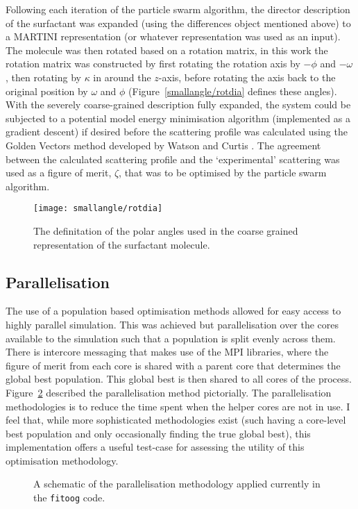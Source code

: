 Following each iteration of the particle swarm algorithm, the director description of the surfactant was expanded (using the differences object mentioned above) to a MARTINI representation (or whatever representation was used as an input).
The molecule was then rotated based on a rotation matrix, in this work the rotation matrix was constructed by first rotating the rotation axis by $-\phi$ and $-\omega$, then rotating by $\kappa$ in around the $z$-axis, before rotating the axis back to the original position by $\omega$ and $\phi$ \cite{evans_rotations_2001} (Figure~\ref{smallangle/rotdia} defines these angles).
With the severely coarse-grained description fully expanded, the system could be subjected to a potential model energy minimisation algorithm (implemented as a gradient descent) if desired before the scattering profile was calculated using the Golden Vectors method developed by Watson and Curtis \cite{watson_rapid_2013}.
The agreement between the calculated scattering profile and the `experimental' scattering was used as a figure of merit, $\zeta$, that was to be optimised by the particle swarm algorithm. 
%
\begin{figure}
    \centering
    \texttt{[image: smallangle/rotdia]}
    \caption{The definitation of the polar angles used in the coarse grained representation of the surfactant molecule.}
    \label{fig:rot}
\end{figure}
%

\subsection{Parallelisation}

The use of a population based optimisation methods allowed for easy access to highly parallel simulation. 
This was achieved but parallelisation over the cores available to the simulation such that a population is split evenly across them. 
There is intercore messaging that makes use of the MPI libraries, where the figure of merit from each core is shared with a parent core that determines the global best population. 
This global best is then shared to all cores of the process. 
Figure~\ref{fig:para} described the parallelisation method pictorially.
The parallelisation methodologies is to reduce the time spent when the helper cores are not in use. 
I feel that, while more sophisticated methodologies exist (such having a core-level best population and only occasionally finding the true global best), this implementation offers a useful test-case for assessing the utility of this optimisation methodology. 
%
\begin{figure}
    \centering
    \caption{A schematic of the parallelisation methodology applied currently in the \texttt{fitoog} code.}
    \label{fig:para}
\end{figure}
%